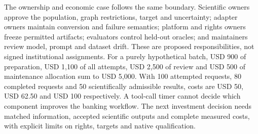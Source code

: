 The ownership and economic case follows the same boundary. Scientific owners
approve the population, graph restrictions, target and uncertainty; adapter
owners maintain conversion and failure semantics; platform and rights owners
freeze permitted artifacts; evaluators control held-out oracles; and maintainers
review model, prompt and dataset drift. These are proposed responsibilities,
not signed institutional assignments. For a purely hypothetical batch, USD 900
of preparation, USD 1,100 of all attempts, USD 2,500 of review and USD 500 of
maintenance allocation sum to USD 5,000. With 100 attempted requests, 80
completed requests and 50 scientifically admissible results, costs are USD 50,
USD 62.50 and USD 100 respectively. A tool-call timer cannot decide which
component improves the banking workflow. The next investment decision needs
matched information, accepted scientific outputs and complete measured costs,
with explicit limits on rights, targets and native qualification.\citep{exec25_agents_choice}

